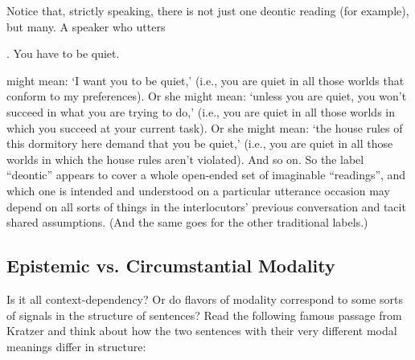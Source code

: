 Notice that, strictly speaking, there is not just one deontic reading (for example), but many. A speaker who utters

\ex. You have to be quiet.

might mean: `I want you to be quiet,' (i.e., you are quiet in all those worlds that conform to my preferences). Or she might mean: `unless you are quiet, you won't succeed in what you are trying to do,' (i.e., you are quiet in all those worlds in which you succeed at your current task). Or she might mean: `the house rules of this dormitory here demand that you be quiet,' (i.e., you are quiet in all those worlds in which the house rules aren't violated). And so on. So the label ``deontic'' appears to cover a whole open-ended set of imaginable ``readings'', and which one is intended and understood on a particular utterance occasion may depend on all sorts of things in the interlocutors' previous conversation and tacit shared assumptions. (And the same goes for the other traditional labels.)

\subsection{Epistemic vs. Circumstantial Modality}

Is it all context-dependency? Or do flavors of modality correspond to some sorts of signals in the structure of sentences? Read the following famous passage from Kratzer and think about how the two sentences with their very different modal meanings differ in structure:

